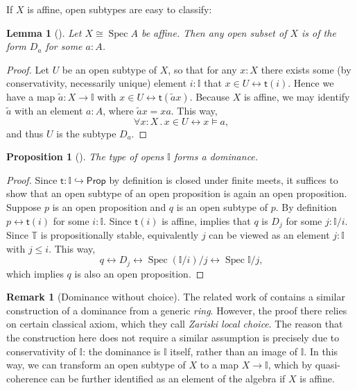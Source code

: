 \documentclass[a4paper,12pt]{amsart}
\newtheorem{lemma}[theorem]{Lemma}
\newtheorem{proposition}[theorem]{Proposition}
\theoremstyle{definition}
\newtheorem{remark}[theorem]{Remark}
\newcommand{\mbb}[1]{\mathbb{#1}}
\newcommand{\T}{\mbb T}
\newcommand{\I}{\mbb I}
\newcommand{\ms}[1]{\mathsf{#1}}
\newcommand{\qsi}[1]{\tilde{#1}}
\newcommand{\hook}{\hookrightarrow}
\newcommand{\fa}[2]{\forall #1\!\colon\!\!#2\mathpunct{.}}
\newcommand{\eq}{\leftrightarrow}
\newcommand{\pp}{\ms{Prop}}
\newcommand{\spec}{\operatorname{Spec}}
\newcommand\istsym{\ms{t}}
\newcommand\ist[1]{\istsym(#1)}
\begin{document}
If $X$ is affine, open subtypes are easy to classify:

\begin{lemma}[\AxiomSQCI]\label{lem:openofaffinegivesalgebra}
  Let $X \cong \spec A$ be affine. Then any open subset of $X$ is of the form $D_a$ for some $a:A$.
\end{lemma}
\begin{proof}
  Let $U$ be an open subtype of $X$, so that for any $x:X$ there exists some (by conservativity, necessarily unique) element $i:\I$ that $x \in U \eq \ist{i}$.
  Hence we have a map $\qsi a \colon X \to \I$ with $x \in U \eq \ist{\qsi ax}$. Because $X$ is affine, we may identify $\qsi a$ with an element $a:A$, where $\qsi ax = xa$. This way,
  \[ \fa xX x \in U \eq x \models a\text{,} \]
  and thus $U$ is the subtype $D_a$.
\end{proof}

\begin{proposition}[\AxiomSQCI]\label{prop:Idominance}
  The type of opens $\I$ forms a dominance.
\end{proposition}
\begin{proof}
  Since $\istsym\colon \I \hook \pp$ by definition is closed under finite meets, it suffices to show that an open subtype of an open proposition is again an open proposition. Suppose $p$ is an open proposition and $q$ is an open subtype of $p$. By definition $p \eq \ist{i}$ for some $i:\I$. Since $\ist{i}$ is affine,  implies that $q$ is $D_j$ for some $j : \I/i$. Since $\T$ is propositionally stable, equivalently $j$ can be viewed as an element $j : \I$ with $j \le i$. This way, 
  \[ q \eq D_j \eq \spec(\I/i)/j \eq \spec\I/j\text{,} \]
  which implies $q$ is also an open proposition.
\end{proof}

\begin{remark}[Dominance without choice]\label{rem:dominancewithoutchoice}
  The related work of \citet{Cherubini_Coquand_Hutzler_2024} contains a similar construction of a dominance from a generic \emph{ring}. However, the proof there relies on certain classical axiom, which they call \emph{Zariski local choice}. The reason that the construction here does not require a similar assumption is precisely due to conservativity of $\I$: the dominance is $\I$ itself, rather than an image of $\I$. In this way, we can transform an open subtype of $X$ to a map $X \to \I$, which by quasi-coherence can be further identified as an element of the algebra if $X$ is affine. 
\end{remark}
\end{document}
